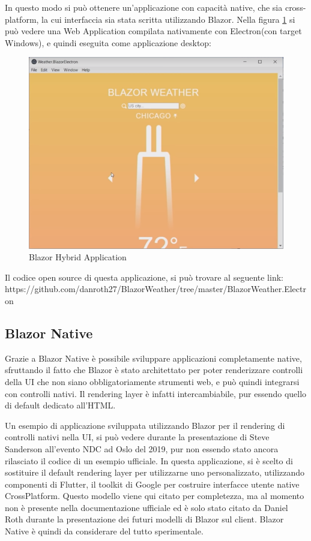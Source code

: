 In questo modo si pu\`o ottenere un'applicazione con capacit\`a native, che sia cross-platform, la cui interfaccia sia stata scritta utilizzando Blazor.
Nella figura \ref{fig:BlazorHybridApplication} si pu\`o vedere una Web Application compilata nativamente con Electron(con target Windows), e quindi eseguita come applicazione desktop:

\begin{figure}[H]
	\centerline{\includegraphics[scale=0.6]{figure/BlazorWeatherElectron.png}}
	\caption{Blazor Hybrid Application}
	\label{fig:BlazorHybridApplication}
\end{figure}

Il codice open source di questa applicazione, si pu\`o trovare al seguente link: https://github.com/danroth27/BlazorWeather/tree/master/BlazorWeather.Electron
\pagebreak

\subsection{Blazor Native}\label{sez:bnative}
Grazie a Blazor Native \`e possibile sviluppare applicazioni completamente native, sfruttando il fatto che Blazor \`e stato architettato per poter renderizzare controlli della UI che non siano obbligatoriamente strumenti web, e pu\`o quindi integrarsi con controlli nativi.
Il rendering layer \`e infatti intercambiabile, pur essendo quello di default dedicato all'HTML.

Un esempio di applicazione sviluppata utilizzando Blazor per il rendering di controlli nativi nella UI, si pu\`o vedere durante la presentazione di Steve Sanderson all'evento NDC ad Oslo del 2019, pur non essendo stato ancora rilasciato il codice di un esempio ufficiale\cite{sandersonNDCBlutter}.
In questa applicazione, si \`e scelto di sostituire il default rendering layer per utilizzarne uno personalizzato, utilizzando componenti di Flutter, il toolkit di Google per costruire interfacce utente native CrossPlatform.
Questo modello viene qui citato per completezza, ma al momento non \`e presente nella documentazione ufficiale ed \`e solo stato citato da Daniel Roth durante la presentazione dei futuri modelli di Blazor sul client\cite{blazorNative}.
Blazor Native \`e quindi da considerare del tutto sperimentale.

